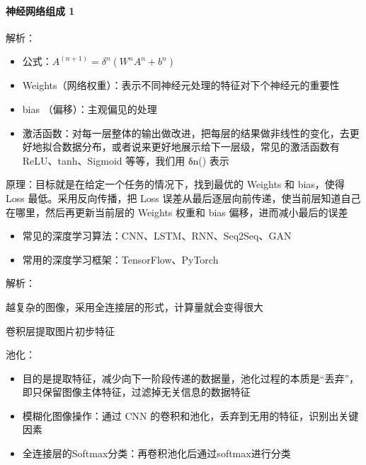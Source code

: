 \documentclass[letterpaper,11pt,english]{sphinxmanual}
\begin{document}
\paragraph{神经网络组成 1\sphinxfootnotemark[847]}
\label{\detokenize{chapter_AI_dive/DL:id2}}%
\begin{footnotetext}[847]\sphinxAtStartFootnote
{}
%
\end{footnotetext}\ignorespaces 
解析：
\begin{itemize}
\item {} 
公式：\(A^{(n+1)}=\delta^{n}\left(W^{n} A^{n}+b^{n}\right)\)

\item {} 
Weights（网络权重）：表示不同神经元处理的特征对下个神经元的重要性

\item {} 
bias （偏移）：主观偏见的处理

\item {} 
激活函数：对每一层整体的输出做改进，把每层的结果做非线性的变化，去更好地拟合数据分布，或者说来更好地展示给下一层级，常见的激活函数有
ReLU、tanh、Sigmoid 等等，我们用 δn() 表示

\end{itemize}

原理：目标就是在给定一个任务的情况下，找到最优的 Weights 和 bias，使得
Loss 最低。采用反向传播，把 Loss
误差从最后逐层向前传递，使当前层知道自己在哪里，然后再更新当前层的
Weights 权重和 bias 偏移，进而减小最后的误差
\begin{itemize}
\item {} 
常见的深度学习算法：CNN、LSTM、RNN、Seq2Seq、GAN

\item {} 
常用的深度学习框架：TensorFlow、PyTorch

\end{itemize}

解析：

越复杂的图像，采用全连接层的形式，计算量就会变得很大

卷积层提取图片初步特征%
\begin{footnote}[848]\sphinxAtStartFootnote
{}
%
\end{footnote}

池化：
\begin{itemize}
\item {} 
目的是提取特征，减少向下一阶段传递的数据量，池化过程的本质是“丢弃”，即只保留图像主体特征，过滤掉无关信息的数据特征

\item {} 
模糊化图像操作：通过 CNN
的卷积和池化，丢弃到无用的特征，识别出关键因素

\item {} 
全连接层的Softmax分类：再卷积池化后通过softmax进行分类

\end{itemize}
\end{document}
